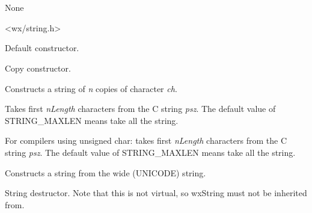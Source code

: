 \section{}\label{wxstring}


None


<wx/string.h>




\label{wxstringconstruct}


Default constructor.


Copy constructor.


Constructs a string of {\it n} copies of character {\it ch}.


Takes first {\it nLength} characters from the C string {\it psz}.
The default value of STRING\_MAXLEN means take all the string.


For compilers using unsigned char: takes first {\it nLength} characters from the C string {\it psz}.
The default value of STRING\_MAXLEN means take all the string.


Constructs a string from the wide (UNICODE) string.

\label{wxstringdestruct}


String destructor. Note that this is not virtual, so wxString must not be inherited from.

\label{wxstringAlloc}


